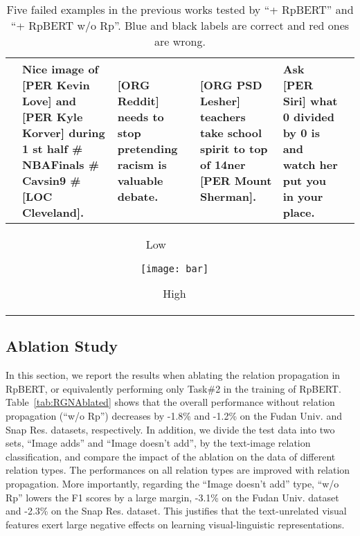 \documentclass[letterpaper]{article} \usepackage{aaai21}  \usepackage{times}  \usepackage{helvet} \usepackage{courier}  \usepackage[hyphens]{url}  \usepackage{graphicx} \urlstyle{rm} \def\UrlFont{\rm}  \usepackage{natbib}  \usepackage{caption} \frenchspacing  \setlength{\pdfpagewidth}{8.5in}  \setlength{\pdfpageheight}{11in}
\begin{document}
\begin{table*}[!h]
\begin{tabular}{|m{}|m{}|m{}|m{}|m{}|m{}|}
		& Nice image of \textbf{[PER Kevin Love]} and \textbf{[PER Kyle Korver]} during 1 st half \# NBAFinals \# Cavsin9 \# {\color{red}\textbf{[LOC Cleveland]}}. \textit{\cite{lu2018visual}}
		&  {\color{red}\textbf{[ORG Reddit]}} needs to stop pretending racism is valuable debate. \textit{\cite{arshad2019aiding}}
		&  {\color{blue}\textbf{[ORG PSD Lesher]}} teachers take school spirit to top of 14ner  {\color{red}\textbf{[PER Mount Sherman]}}. \textit{\cite{arshad2019aiding}}
					& Ask {\color{red}\textbf{[PER Siri]}} what 0 divided by 0 is and watch her put you in your place. \textit{\cite{yu2020improving}}\\
		\hline
		
		\multicolumn{5}{c}{		 \hspace{7em}  Low ~~~~~~\begin{minipage}[p]{0.29\textwidth}
				\vspace{0.6em} 	\texttt{[image: bar]}
			\end{minipage} High}\\
		
	\end{tabular}
		\caption{Five failed examples in the previous works tested by  ``+ RpBERT'' and ``+ RpBERT w/o Rp''. Blue and black labels are correct and red ones are wrong.}\label{tab:case}
\end{table*}





\subsection{Ablation Study}



In this section, we report the results when ablating the relation propagation in  RpBERT,
or equivalently  performing only Task\#2  in the training of  RpBERT.
Table~\ref{tab:RGNAblated} shows that the overall performance without relation propagation (``w/o Rp'') decreases by -1.8\% and -1.2\% on the Fudan Univ. and Snap Res. datasets, respectively.
In addition, we divide the test data into two sets, ``Image adds'' and ``Image doesn't add'', by the text-image relation classification, and compare the impact of the ablation on the data of different relation types.
The performances on all relation types are improved with relation propagation.
More importantly, regarding the ``Image doesn't add'' type, ``w/o Rp'' lowers the F1 scores by a large margin, -3.1\% on the Fudan Univ. dataset and -2.3\% on the Snap Res. dataset.
This justifies that the text-unrelated visual features exert large negative effects on learning visual-linguistic representations.
\end{document}
